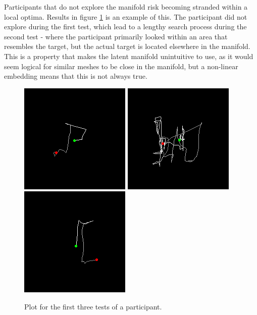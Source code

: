 \documentclass[ %
author={Dillon Keith Diep},
supervisor={Dr. Carl Henrik Ek},
degree={MEng},
title={ART-CG:},
subtitle={Assisted Real-time Content Generation of 3D Hair by Learning Manifolds},
type={Research},
year={2017} ]{dissertation}
\begin{document}
Participants that do not explore the manifold risk becoming stranded within a local optima. Results in figure \ref{mariaresult} is an example of this. The participant did not explore during the first test, which lead to a lengthy search process during the second test - where the participant primarily looked within an area that resembles the target, but the actual target is located elsewhere in the manifold. This is a property that makes the latent manifold unintuitive to use, as it would seem logical for similar meshes to be close in the manifold, but a non-linear embedding means that this is not always true.

\begin{figure}[!h]
	\centering
	\caption{Plot for the first three tests of a participant.}
	\includegraphics[scale=0.6]{images/experiment/Maria_Marinova_ONE_REPLOT}
	\includegraphics[scale=0.6]{images/experiment/Maria_Marinova_TWO_REPLOT}
	\includegraphics[scale=0.6]{images/experiment/Maria_Marinova_THREE_REPLOT}
	\label{mariaresult}
\end{figure}
\end{document}

